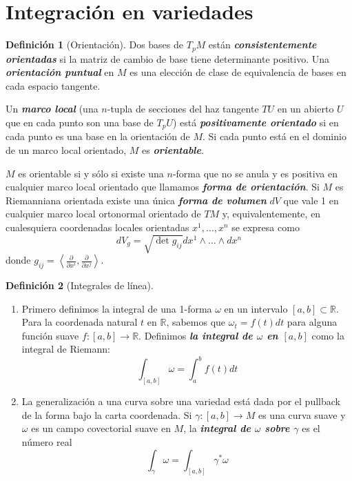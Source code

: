 \documentclass[spanish]{article}
\theoremstyle{definition}
\newtheorem*{defn}{Definición}
\newcommand{\R}{\mathbb{R}}
\begin{document}
	\section{Integración en variedades}\label{sec:4}
	\begin{defn}[Orientación]\leavevmode
		
		Dos bases de $T_pM$ están \textbf{\textit{consistentemente orientadas}} si la matriz de cambio de base tiene determinante positivo. Una \textbf{\textit{orientación puntual}} en $M$ es una elección de clase de equivalencia de bases en cada espacio tangente. 
		
		Un \textbf{\textit{marco local}} (una $n$-tupla de secciones del haz tangente $TU$ en un abierto $U$ que en cada punto son una base de $T_pU$) está \textbf{\textit{positivamente orientado}} si en cada punto es una base en la orientación de $M$. Si cada punto está en el dominio de un marco local orientado, $M$ es \textbf{\textit{orientable}}.
		
		$M$ es orientable si y sólo si existe una $n$-forma que no se anula y es positiva en cualquier marco local orientado que llamamos \textbf{\textit{forma de orientación}}. Si $M$ es Riemanniana orientada existe una única \textbf{\textit{forma de volumen}} $dV$ que vale 1 en cualquier marco local ortonormal orientado de $TM$ y, equivalentemente, en cualesquiera coordenadas locales orientadas $x^1,\ldots,x^n$ se expresa como
		\[dV_g=\sqrt{\det g_{ij}}dx^1\wedge\ldots\wedge dx^n\]
		donde $g_{ij}=\left\langle\frac{\partial}{\partial x^i},\frac{\partial}{\partial x^j}\right\rangle$.
	\end{defn}
	
	\iffalse
	\begin{defn}[Integrales de línea]\leavevmode
		\begin{enumerate}
			\item Primero definimos la integral de una 1-forma $\omega$ en un intervalo $[a,b]\subset\R$. Para la coordenada natural $t$ en $\R$, sabemos que $\omega_t=f(t)dt$ para alguna función suave $f:[a,b]\to\R$. Definimos \textbf{\textit{la integral de $\omega$ en $[a,b]$}} como la integral de Riemann:
			\[\int_{[a,b]}\omega=\int_a^bf(t)dt\]
			
			\item La generalización a una curva sobre una variedad está dada por el pullback de la forma bajo la carta coordenada. Si $\gamma:[a,b]\to M$ es una curva suave y $\omega$ es un campo covectorial suave en $M$, la \textbf{\textit{integral de $\omega$ sobre $\gamma$}} es el número real
			\[\int_\gamma\omega=\int_{[a,b]}\gamma^*\omega\]
		\end{enumerate}
	\end{defn}
	
\end{document}

